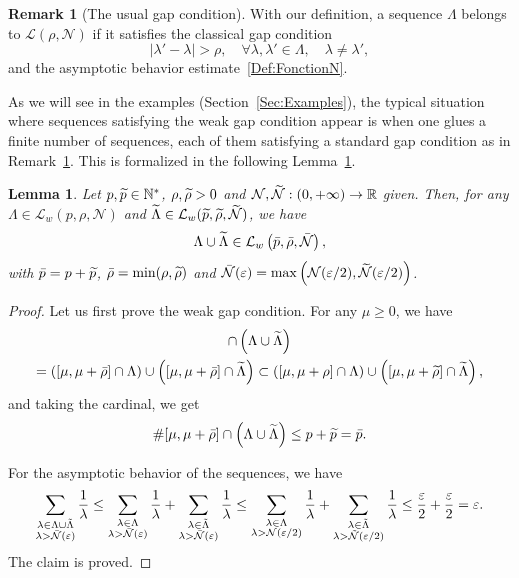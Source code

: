 \documentclass[11pt]{article}
\newtheorem{lemm}[theo]{Lemma}
\theoremstyle{definition}
\newtheorem{rema}[theo]{Remark}
\numberwithin{equation}{section}
\numberwithin{figure}{section}
\numberwithin{table}{section}
\newcommand{\LL}{\mathcal{L}}
\newcommand{\NN}{\mathcal{N}}
\newcommand{\N}{\mathbb{N}}
\newcommand{\R}{\mathbb{R}}
\let\oldtilde\tilde
\renewcommand*{\tilde}[1]{\mathchoice{\widetilde{#1}}{\widetilde{#1}}{\oldtilde{#1}}{\oldtilde{#1}}}\let\oldexists\exists
\renewcommand*{\exists}{\mathrel{\oldexists}}
\let\oldforall\forall
\renewcommand*{\forall}{\mathrel{\oldforall}}
\begin{document}
\begin{rema}[The usual gap condition]\label{Rem:usual_gap}
With our definition, a sequence $\Lambda$ belongs to $\LL(\rho,\NN)$ if it satisfies the classical gap condition
\begin{equation}\label{FattoriniRussell_Gap}
|\lambda' - \lambda| > \rho, \quad \forall \lambda,\lambda'\in \Lambda, \quad \lambda\neq \lambda',
\end{equation}
and the asymptotic behavior estimate~\eqref{Def:FonctionN}.
\end{rema}

As we will see in the examples (Section~\ref{Sec:Examples}), the typical situation where sequences satisfying the weak gap condition appear is when one glues a finite number of sequences, each of them satisfying a standard gap condition as in Remark~\ref{Rem:usual_gap}. This is formalized in the following Lemma~\ref{Lem:Stabilite_Lw_Union}.


\begin{lemm}\label{Lem:Stabilite_Lw_Union}
Let $p,\tilde{p} \in \N^*$, $\rho,\tilde{\rho} > 0$ and $\NN,\tilde{\NN} : (0,+\infty) \to \R$ given. Then, for any $\Lambda\in \LL_w(p, \rho, \NN)$ and $\tilde{\Lambda}\in \LL_w(\tilde{p}, \tilde{\rho}, \tilde{\NN})$, we have
\[
\Lambda \cup \tilde{\Lambda} \in \LL_w\left(\bar{p}, \bar{\rho}, \bar{\NN}\right),
\]
with $\bar{p}=p+\tilde{p}$, $\bar{\rho}=\min(\rho,\tilde{\rho})$ and $\bar{\NN}(\varepsilon) = \max \left(\NN(\varepsilon/2),\tilde{\NN}(\varepsilon/2)\right)$.
\end{lemm}

\begin{proof}
Let us first prove the weak gap condition. For any $\mu\geq 0$, we have
\begin{multline*}
[\mu,\mu+\bar{\rho}] \cap \left(\Lambda\cup \tilde{\Lambda}\right)\\ = \left([\mu,\mu+\bar{\rho}] \cap \Lambda \right) \cup \left([\mu,\mu+\bar{\rho}]\cap \tilde{\Lambda}\right)
\subset \left([\mu,\mu+\rho] \cap \Lambda \right) \cup \left([\mu,\mu+\tilde{\rho}]\cap \tilde{\Lambda}\right),
\end{multline*}
and taking the cardinal, we get
\[
\# [\mu,\mu+\bar{\rho}] \cap \left(\Lambda\cup \tilde{\Lambda}\right) \leq p + \tilde{p}=\bar{p}.
\]

For the asymptotic behavior of the sequences, we have
\[
\sum_{\substack{\lambda \in \Lambda\cup \tilde{\Lambda} \\ \lambda>\bar{\NN}(\varepsilon)}} \frac{1}{\lambda}
\leq \sum_{\substack{\lambda \in \Lambda \\ \lambda>\bar{\NN}(\varepsilon)}} \frac{1}{\lambda} + \sum_{\substack{\lambda \in \tilde{\Lambda} \\ \lambda>\bar{\NN}(\varepsilon)}} \frac{1}{\lambda}
\leq \sum_{\substack{\lambda \in \Lambda \\ \lambda>{\NN}(\varepsilon/2)}} \frac{1}{\lambda} + \sum_{\substack{\lambda \in \tilde{\Lambda} \\ \lambda>\tilde{\NN}(\varepsilon/2)}} \frac{1}{\lambda}
\leq \frac{\varepsilon}{2} + \frac{\varepsilon}{2} = \varepsilon.
\]
The claim is proved.
\end{proof}
\end{document}
